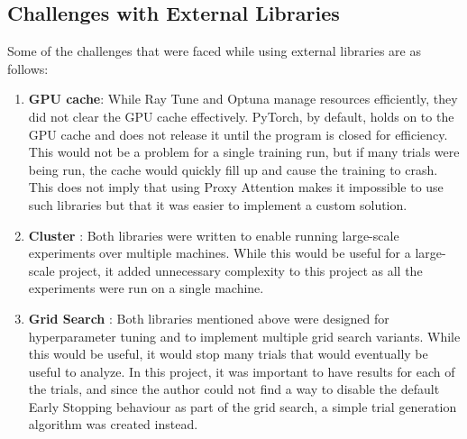 \subsection{Challenges with External Libraries} \label{sec:challenges_with_external_libraries}
Some of the challenges that were faced while using external libraries are as follows:
\begin{enumerate}
    \item \textbf{GPU cache}: While Ray Tune and Optuna manage resources efficiently, they did not clear the GPU cache effectively. PyTorch, by default, holds on to the GPU cache and does not release it until the program is closed for efficiency. This would not be a problem for a single training run, but if many trials were being run, the cache would quickly fill up and cause the training to crash. This does not imply that using Proxy Attention makes it impossible to use such libraries but that it was easier to implement a custom solution.
    \item \textbf{Cluster} : Both libraries were written to enable running large-scale experiments over multiple machines. While this would be useful for a large-scale project, it added unnecessary complexity to this project as all the experiments were run on a single machine.
    \item \textbf{Grid Search} : Both libraries mentioned above were designed for hyperparameter tuning and to implement multiple grid search variants. While this would be useful, it would stop many trials that would eventually be useful to analyze. In this project, it was important to have results for each of the trials, and since the author could not find a way to disable the default Early Stopping behaviour as part of the grid search, a simple trial generation algorithm was created instead.
\end{enumerate}